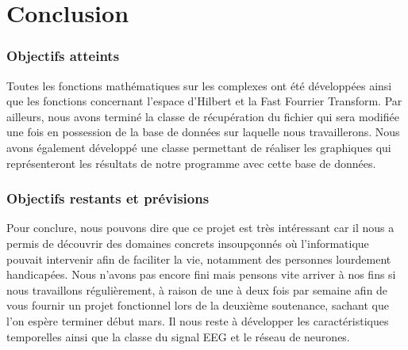 \part{Conclusion}
	
	\section{Objectifs atteints} %

		Toutes les fonctions mathématiques sur les complexes ont été développées ainsi que les fonctions concernant l'espace d'Hilbert et la Fast Fourrier Transform. Par ailleurs, nous avons terminé la classe de récupération du fichier qui sera modifiée une fois en possession de la base de données sur laquelle nous travaillerons. Nous avons également développé une classe permettant de réaliser les graphiques qui représenteront les résultats de notre programme avec cette base de données. 	
	
	\label{sec:objectif_atteint}
	
	\section{Objectifs restants et prévisions} %
	\label{sec:objectif_restant}
	
	Pour conclure, nous pouvons dire que ce projet est très intéressant car il nous a permis de découvrir des domaines concrets insoupçonnés où l'informatique pouvait intervenir afin de faciliter la vie, notamment des personnes lourdement handicapées. Nous n'avons pas encore fini mais pensons vite arriver à nos fins si nous travaillons régulièrement, à raison de une à deux fois par semaine afin de vous fournir un projet fonctionnel lors de la deuxième soutenance, sachant que l'on espère terminer début mars.
	Il nous reste à développer les caractéristiques temporelles ainsi que la classe du signal EEG et le réseau de neurones.  